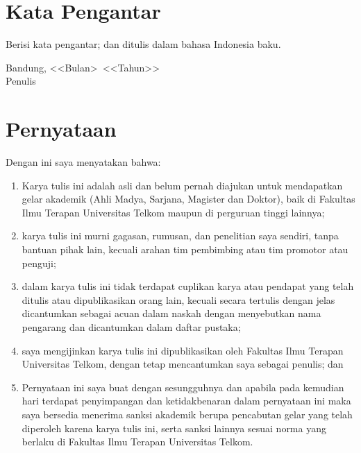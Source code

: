 \documentclass[a4paper,11pt,oneside]{report}
\begin{document}
\chapter*{Kata Pengantar}

Berisi kata pengantar; dan ditulis dalam bahasa Indonesia baku.

\vspace{3cm}
\begin{flushright}
    Bandung, \textless\textless Bulan\textgreater\ \textless\textless Tahun\textgreater\textgreater\\[6pt]
    Penulis
\end{flushright}

\chapter*{Pernyataan}

Dengan ini saya menyatakan bahwa:
\begin{enumerate}[label=\arabic*.]
    \item Karya tulis ini adalah asli dan belum pernah diajukan untuk mendapatkan
    gelar akademik (Ahli Madya, Sarjana, Magister dan Doktor), baik di Fakultas
    Ilmu Terapan Universitas Telkom maupun di perguruan tinggi lainnya;
    \item karya tulis ini murni gagasan, rumusan, dan penelitian saya sendiri,
    tanpa bantuan pihak lain, kecuali arahan tim pembimbing atau tim promotor
    atau penguji;
    \item dalam karya tulis ini tidak terdapat cuplikan karya atau pendapat yang
    telah ditulis atau dipublikasikan orang lain, kecuali secara tertulis dengan
    jelas dicantumkan sebagai acuan dalam naskah dengan menyebutkan nama
    pengarang dan dicantumkan dalam daftar pustaka;
    \item saya mengijinkan karya tulis ini dipublikasikan oleh Fakultas Ilmu
    Terapan Universitas Telkom, dengan tetap mencantumkan saya sebagai penulis;
    dan
    \item Pernyataan ini saya buat dengan sesungguhnya dan apabila pada kemudian
    hari terdapat penyimpangan dan ketidakbenaran dalam pernyataan ini maka saya
    bersedia menerima sanksi akademik berupa pencabutan gelar yang telah
    diperoleh karena karya tulis ini, serta sanksi lainnya sesuai norma yang
    berlaku di Fakultas Ilmu Terapan Universitas Telkom.
\end{enumerate}
\end{document}
